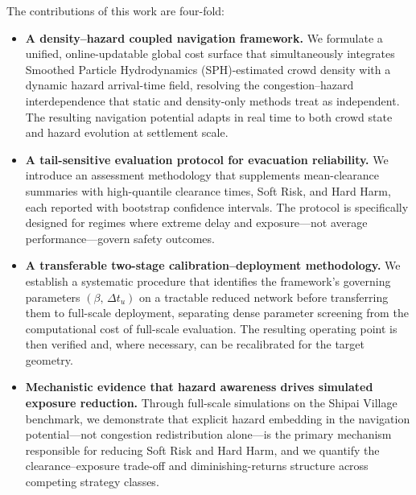 \documentclass[preprint,12pt]{elsarticle}
\begin{document}
The contributions of this work are four-fold:
\begin{itemize}

    \item \textbf{A density--hazard coupled navigation framework.}
    We formulate a unified, online-updatable global cost surface that
    simultaneously integrates Smoothed Particle Hydrodynamics (SPH)-estimated crowd density with a dynamic
    hazard arrival-time field, resolving the congestion--hazard
    interdependence that static and density-only methods treat as
    independent. The resulting navigation potential adapts in real time
    to both crowd state and hazard evolution at settlement scale.

    \item \textbf{A tail-sensitive evaluation protocol for evacuation
    reliability.} We introduce an assessment methodology that supplements
    mean-clearance summaries with high-quantile clearance times, Soft Risk,
    and Hard Harm, each reported with bootstrap confidence intervals. The protocol is
    specifically designed for regimes where extreme delay and
    exposure---not average performance---govern safety outcomes.

    \item \textbf{A transferable two-stage calibration--deployment
    methodology.} We establish a systematic procedure that identifies the
    framework's governing parameters $(\beta,\,\Delta t_{u})$ on a
    tractable reduced network before transferring them to full-scale
    deployment, separating dense parameter screening from the computational
    cost of full-scale evaluation. The resulting operating point is then
    verified and, where necessary, can be recalibrated for the target geometry.

    \item \textbf{Mechanistic evidence that hazard awareness drives
    simulated exposure reduction.} Through full-scale
    simulations on the Shipai Village benchmark, we demonstrate that
    explicit hazard embedding in the navigation potential---not
    congestion redistribution alone---is the primary mechanism
    responsible for reducing Soft Risk and Hard Harm, and we
    quantify the clearance--exposure trade-off and diminishing-returns
    structure across competing strategy classes.

\end{itemize}
\end{document}
